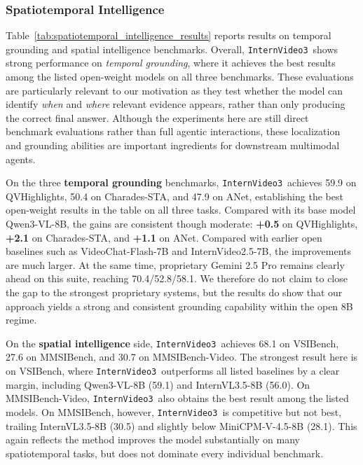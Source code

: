 \documentclass[11pt, letterpaper]{template}
\theoremstyle{plain}
\theoremstyle{definition}
\theoremstyle{remark}
\newcommand{\name}{\texttt{InternVideo3}\xspace}
\begin{document}
\subsubsection{Spatiotemporal Intelligence}

Table~\ref{tab:spatiotemporal_intelligence_results} reports results on temporal grounding and spatial intelligence benchmarks. Overall, \name\ shows strong performance on \emph{temporal grounding}, where it achieves the best results among the listed open-weight models on all three benchmarks. These evaluations are particularly relevant to our motivation as they test whether the model can identify \emph{when} and \emph{where} relevant evidence appears, rather than only producing the correct final answer. Although the experiments here are still direct benchmark evaluations rather than full agentic interactions, these localization and grounding abilities are important ingredients for downstream multimodal agents.

On the three \textbf{temporal grounding} benchmarks, \name\ achieves 59.9 on QVHighlights, 50.4 on Charades-STA, and 47.9 on ANet, establishing the best open-weight results in the table on all three tasks. Compared with its base model Qwen3-VL-8B, the gains are consistent though moderate: \textbf{+0.5} on QVHighlights, \textbf{+2.1} on Charades-STA, and \textbf{+1.1} on ANet. Compared with earlier open baselines such as VideoChat-Flash-7B and InternVideo2.5-7B, the improvements are much larger. At the same time, proprietary Gemini 2.5 Pro remains clearly ahead on this suite, reaching 70.4/52.8/58.1. We therefore do not claim to close the gap to the strongest proprietary systems, but the results do show that our approach yields a strong and consistent grounding capability within the open 8B regime.

On the \textbf{spatial intelligence} side, \name\ achieves 68.1 on VSIBench, 27.6 on MMSIBench, and 30.7 on MMSIBench-Video. The strongest result here is on VSIBench, where \name\ outperforms all listed baselines by a clear margin, including Qwen3-VL-8B (59.1) and InternVL3.5-8B (56.0). On MMSIBench-Video, \name\ also obtains the best result among the listed models. On MMSIBench, however, \name\ is competitive but not best, trailing InternVL3.5-8B (30.5) and slightly below MiniCPM-V-4.5-8B (28.1). This again reflects the method improves the model substantially on many spatiotemporal tasks, but does not dominate every individual benchmark.
\end{document}
